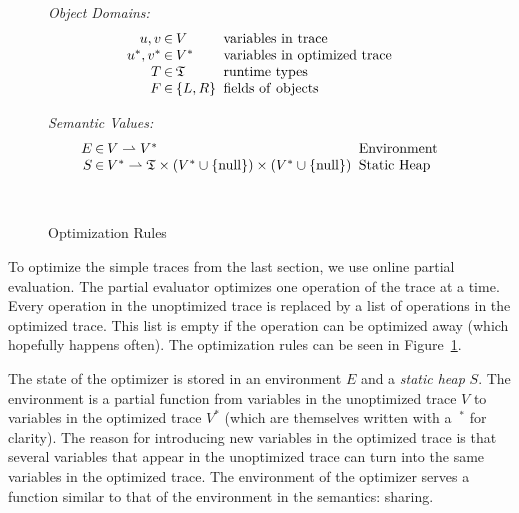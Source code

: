 \documentclass[preprint]{sigplanconf}
\begin{document}
\begin{figure}
\begin{center}
\begin{minipage}[b]{7 cm}
\emph{Object Domains:}
$$\setlength\arraycolsep{0.1em}
 \begin{array}{rcll}
    u,v & \in & V & \mathrm{\ variables\ in\ trace}\\
    u^*,v^* & \in & V^* & \mathrm{\ variables\ in\ optimized\ trace}\\
    T & \in & \mathfrak{T} & \mathrm{\ runtime\ types}\\
    F & \in & \left\{ L,R\right\} & \mathrm{\ fields\ of\ objects}\\
 \end{array}
$$
\end{minipage}
\begin{minipage}[b]{5 cm}
\emph{Semantic Values:}
$$\setlength\arraycolsep{0.1em}
 \begin{array}{rcll}
    E & \in & V\rightharpoonup V^* & \mathrm{\ Environment}\\
    S & \in & V^*\rightharpoonup\mathfrak{T}\times(V^*\cup \{ \mathrm{null} \})\times (V^*\cup \{ \mathrm{null}\} ) & \mathrm{\ Static\ Heap}\\
    \\
    \\
 \end{array}
$$
\end{minipage}
\end{center}
\caption{Optimization Rules}
\label{fig:optimization}
\end{figure}

To optimize the simple traces from the last section, we use online partial
evaluation. The partial evaluator optimizes one operation of the trace at a
time. Every operation in the unoptimized trace is replaced by a list of
operations in the optimized trace. This list is empty if the operation
can be optimized away (which hopefully happens often). The optimization rules
can be seen in Figure~\ref{fig:optimization}.

The state of the optimizer is stored in an environment $E$ and a \emph{static
heap} $S$. The environment is a partial function from variables in the
unoptimized trace $V$ to variables in the optimized trace $V^*$ (which are
themselves written with a
$\ ^*$ for clarity). The reason for introducing new variables in the optimized
trace is that several variables that appear in the unoptimized trace can turn
into the same variables in the optimized trace. The environment of the
optimizer serves a function similar to that of the environment in the semantics: sharing.
\end{document}
